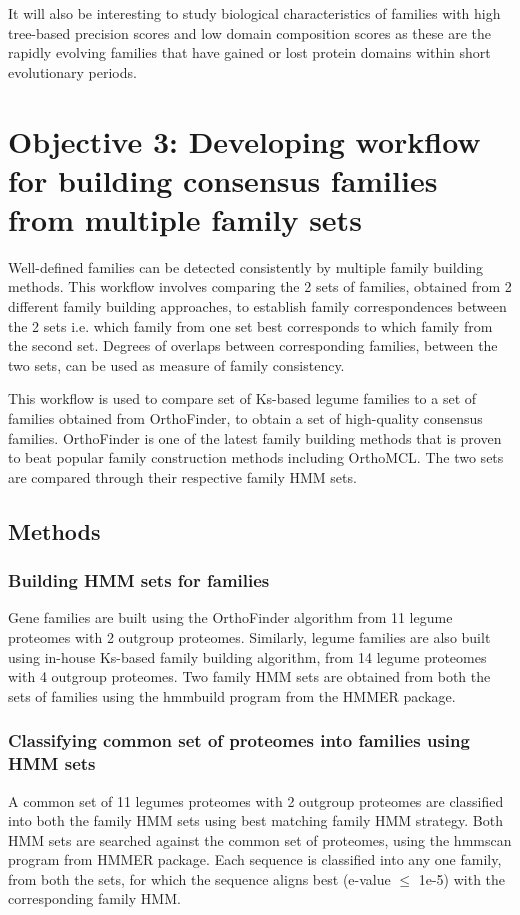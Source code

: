 \documentclass{article}
\begin{document}
	It will also be interesting to study biological characteristics of families with high tree-based precision scores and low domain composition scores as these are the rapidly evolving families that have gained or lost protein domains within short evolutionary periods.
	
	\pagebreak
	\section{Objective 3: Developing workflow for building consensus families from multiple family sets}
	Well-defined families can be detected consistently by multiple family building methods. This workflow involves comparing the 2 sets of families, obtained from 2 different family building approaches, to establish family correspondences between the 2 sets i.e. which family from one set best corresponds to which family from the second set. Degrees of overlaps between corresponding families, between the two sets, can be used as measure of family consistency.
	
	This workflow is used to compare set of Ks-based legume families to a set of families obtained from OrthoFinder, to obtain a set of high-quality consensus families. OrthoFinder is one of the latest family building methods that is proven to beat popular family construction methods including OrthoMCL. The two sets are compared through their respective family HMM sets.
	
		\subsection{Methods}
			\subsubsection{Building HMM sets for families}
			Gene families are built using the OrthoFinder algorithm from 11 legume proteomes with 2 outgroup proteomes. Similarly, legume families are also built using in-house Ks-based family building algorithm, from 14 legume proteomes with 4 outgroup proteomes. Two family HMM sets are obtained from both the sets of families using the hmmbuild program from the HMMER package.
			
			\subsubsection{Classifying common set of proteomes into families using HMM sets}
			A common set of 11 legumes proteomes with 2 outgroup proteomes are classified into both the family HMM sets using best matching family HMM strategy. Both HMM sets are searched against the common set of proteomes, using the hmmscan program from HMMER package. Each sequence is classified into any one family, from both the sets, for which the sequence aligns best (e-value $\leq$ 1e-5) with the corresponding family HMM.
			
\end{document}
